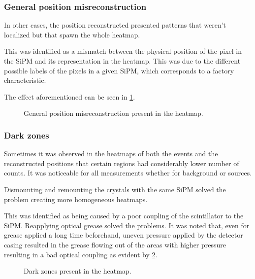\subsubsection{General position misreconstruction}

In other cases, the position reconstructed presented patterns that weren't localized but that spawn the whole heatmap.

This was identified as a mismatch between the physical position of the pixel in the \ac{SiPM} and its representation in the heatmap.
This was due to the different possible labels of the pixels in a given \ac{SiPM}, which corresponds to a factory characteristic.

The effect aforementioned can be seen in \ref{fig:PositionMisreconstructionHeatmap}.

\begin{figure}[h!]
    \centering
    \caption{General position misreconstruction present in the heatmap.}%
    \label{fig:PositionMisreconstructionHeatmap}
\end{figure}

\subsubsection{Dark zones}

Sometimes it was observed in the heatmaps of both the events and the reconstructed positions that certain regions had considerably lower number of counts. It was  noticeable for all measurements whether for background or sources.

Dismounting and remounting the crystals with the same \ac{SiPM} solved the problem creating more homogeneous heatmaps.

This was identified as being caused by a poor coupling of the scintillator to the \ac{SiPM}. Reapplying optical grease solved the problems. It was noted that, even for grease applied a long time beforehand, uneven pressure applied by the detector casing resulted in the grease flowing out of the areas with higher pressure resulting in a bad optical coupling as evident by \ref{fig:DarkZonesHeatmap}.

\begin{figure}[h!]
    \centering
    \qquad
    \caption{Dark zones present in the heatmap.}%
    \label{fig:DarkZonesHeatmap}
\end{figure}

